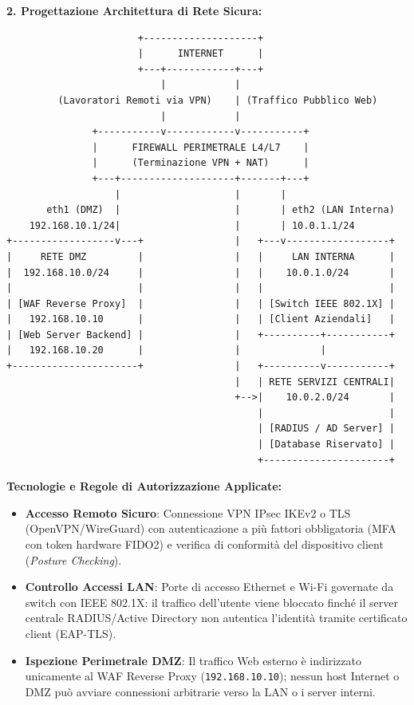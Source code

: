 \documentclass[11pt,a4paper]{article}
\begin{document}
\begin{solutionbox}
\textbf{2. Progettazione Architettura di Rete Sicura:}
\begin{center}
\begin{verbatim}
                       +--------------------+
                       |      INTERNET      |
                       +---+------------+---+
                           |            |
         (Lavoratori Remoti via VPN)    | (Traffico Pubblico Web)
                           |            |
               +-----------v------------v-----------+
               |      FIREWALL PERIMETRALE L4/L7    |
               |      (Terminazione VPN + NAT)      |
               +---+--------------------+-------+---+
                   |                    |       |
       eth1 (DMZ)  |                    |       | eth2 (LAN Interna)
    192.168.10.1/24|                    |       | 10.0.1.1/24
+------------------v---+                |   +---v------------------+
|     RETE DMZ         |                |   |     LAN INTERNA      |
|  192.168.10.0/24     |                |   |    10.0.1.0/24       |
|                      |                |   |                      |
| [WAF Reverse Proxy]  |                |   | [Switch IEEE 802.1X] |
|   192.168.10.10      |                |   | [Client Aziendali]   |
| [Web Server Backend] |                |   +----------+-----------+
|   192.168.10.20      |                |              |
+----------------------+                |   +----------v-----------+
                                        |   | RETE SERVIZI CENTRALI|
                                        +-->|    10.0.2.0/24       |
                                            |                      |
                                            | [RADIUS / AD Server] |
                                            | [Database Riservato] |
                                            +----------------------+
\end{verbatim}
\end{center}

\textbf{Tecnologie e Regole di Autorizzazione Applicate:}
\begin{itemize}
    \item \textbf{Accesso Remoto Sicuro}: Connessione VPN IPsec IKEv2 o TLS (OpenVPN/WireGuard) con autenticazione a pi\`u fattori obbligatoria (MFA con token hardware FIDO2) e verifica di conformit\`a del dispositivo client (\textit{Posture Checking}).
    \item \textbf{Controllo Accessi LAN}: Porte di accesso Ethernet e Wi-Fi governate da switch con IEEE 802.1X: il traffico dell'utente viene bloccato finch\'e il server centrale RADIUS/Active Directory non autentica l'identit\`a tramite certificato client (EAP-TLS).
    \item \textbf{Ispezione Perimetrale DMZ}: Il traffico Web esterno \`e indirizzato unicamente al WAF Reverse Proxy (\texttt{192.168.10.10}); nessun host Internet o DMZ pu\`o avviare connessioni arbitrarie verso la LAN o i server interni.
\end{itemize}
\end{solutionbox}
\end{document}
